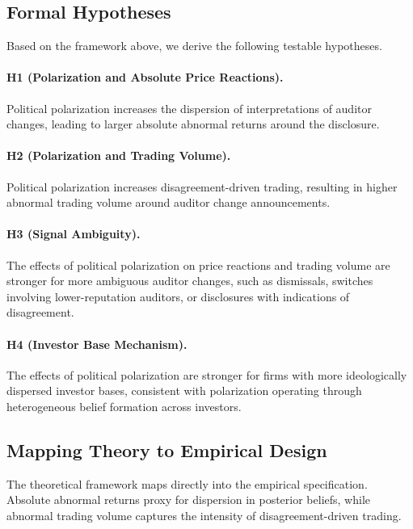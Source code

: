 \subsection{Formal Hypotheses}

Based on the framework above, we derive the following testable hypotheses.

\paragraph{H1 (Polarization and Absolute Price Reactions).}
Political polarization increases the dispersion of interpretations of auditor changes, leading to larger absolute abnormal returns around the disclosure.

\paragraph{H2 (Polarization and Trading Volume).}
Political polarization increases disagreement-driven trading, resulting in higher abnormal trading volume around auditor change announcements.

\paragraph{H3 (Signal Ambiguity).}
The effects of political polarization on price reactions and trading volume are stronger for more ambiguous auditor changes, such as dismissals, switches involving lower-reputation auditors, or disclosures with indications of disagreement.

\paragraph{H4 (Investor Base Mechanism).}
The effects of political polarization are stronger for firms with more ideologically dispersed investor bases, consistent with polarization operating through heterogeneous belief formation across investors.

\subsection{Mapping Theory to Empirical Design}

The theoretical framework maps directly into the empirical specification. Absolute abnormal returns proxy for dispersion in posterior beliefs, while abnormal trading volume captures the intensity of disagreement-driven trading.

